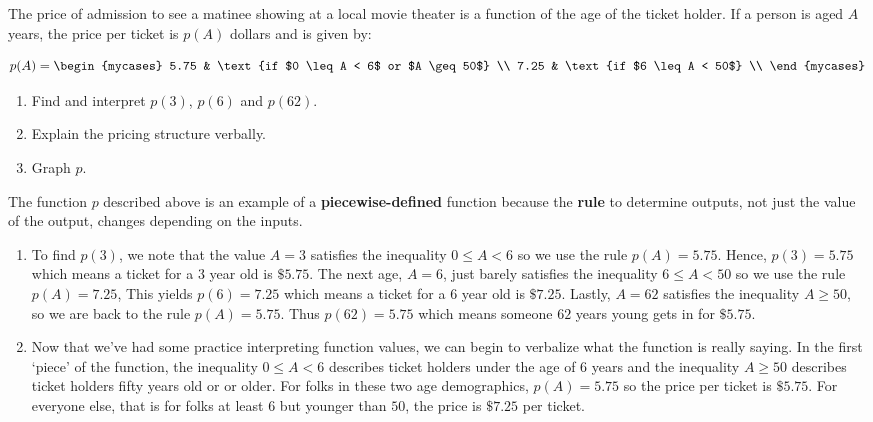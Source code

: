 \documentclass{ximera}
\begin{document}
\begin{example} \label{piecewiseconstantex}  The price of admission to see a matinee showing at a local movie theater is a function of the age  of the ticket holder.  If a person is aged $A$ years, the price per ticket is $p(A)$ dollars and is given by:

\[ p(A) = \begin{mycases} 
      5.75 &  \text{if $0 \leq A < 6$ or $A \geq 50$} \\
      7.25  & \text{if $6 \leq A < 50$} \\
   \end{mycases}
\]

\begin{enumerate}

\item Find and interpret $p(3)$, $p(6)$ and $p(62)$.

\item Explain the pricing structure verbally.

\item Graph $p$.

\end{enumerate}

\begin{explanation}  The function $p$ described above is an example of a  \textbf{piecewise-defined} function because the \textbf{rule} to determine outputs, not just the value of the output,  changes depending on the inputs.

\begin{enumerate}

\item To find $p(3)$, we note that the value $A = 3$ satisfies the inequality $0 \leq A < 6$ so we use the rule $p(A) = 5.75$.  Hence, $p(3) = 5.75$ which means a ticket for a $3$ year old is $\$ 5.75$.  The next age, $A = 6$, just barely satisfies the inequality $6 \leq A < 50$ so we use the rule $p(A) = 7.25$, This yields $p(6) = 7.25$ which means a ticket for a $6$ year old is $\$ 7.25$.  Lastly, $A = 62$ satisfies the inequality $A \geq 50$, so we are back to the rule $p(A) = 5.75$.  Thus $p(62) = 5.75$ which means someone $62$ years young gets in for $\$ 5.75$.

\item  Now that we've had some practice interpreting function values, we can begin to verbalize what the function is really saying.  In the first `piece' of the function, the inequality $0 \leq A < 6$  describes ticket holders under the age of 6 years and  the inequality $A \geq 50$ describes ticket holders fifty years old or or older.  For  folks in these two age demographics, $p(A) = 5.75$ so the price per ticket is $\$ 5.75$.  For everyone else, that is for folks at least $6$ but younger than $50$, the price is $\$7.25$ per ticket.


\end{enumerate}
\end{explanation}
\end{example}
\end{document}
